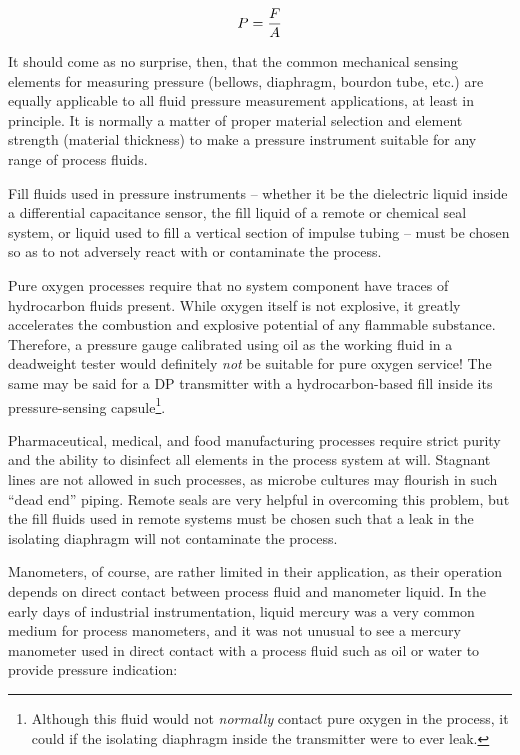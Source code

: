 $$P = {F \over A}$$ 

It should come as no surprise, then, that the common mechanical sensing elements for measuring pressure (bellows, diaphragm, bourdon tube, etc.) are equally applicable to all fluid pressure measurement applications, at least in principle.  It is normally a matter of proper material selection and element strength (material thickness) to make a pressure instrument suitable for any range of process fluids.

Fill fluids used in pressure instruments -- whether it be the dielectric liquid inside a differential capacitance sensor, the fill liquid of a remote or chemical seal system, or liquid used to fill a vertical section of impulse tubing -- must be chosen so as to not adversely react with or contaminate the process.  

Pure oxygen processes require that no system component have traces of hydrocarbon fluids present.  While oxygen itself is not explosive, it greatly accelerates the combustion and explosive potential of any flammable substance.  Therefore, a pressure gauge calibrated using oil as the working fluid in a deadweight tester would definitely \textit{not} be suitable for pure oxygen service!  The same may be said for a DP transmitter with a hydrocarbon-based fill inside its pressure-sensing capsule\footnote{Although this fluid would not \textit{normally} contact pure oxygen in the process, it could if the isolating diaphragm inside the transmitter were to ever leak.}.

Pharmaceutical, medical, and food manufacturing processes require strict purity and the ability to disinfect all elements in the process system at will.  Stagnant lines are not allowed in such processes, as microbe cultures may flourish in such ``dead end'' piping.  Remote seals are very helpful in overcoming this problem, but the fill fluids used in remote systems must be chosen such that a leak in the isolating diaphragm will not contaminate the process.

\vskip 10pt

\filbreak

Manometers, of course, are rather limited in their application, as their operation depends on direct contact between process fluid and manometer liquid.  In the early days of industrial instrumentation, liquid mercury was a very common medium for process manometers, and it was not unusual to see a mercury manometer used in direct contact with a process fluid such as oil or water to provide pressure indication:

